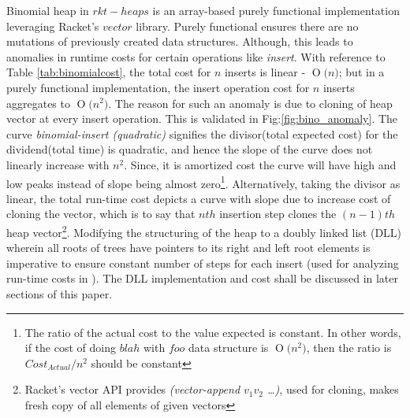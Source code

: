 \documentclass{llncs}
\newcommand{\BigO}[1]{\ensuremath{\operatorname{O}\bigl(#1\bigr)}}
\begin{document}
Binomial heap in $rkt-heaps$ is an array-based purely functional implementation leveraging Racket's $vector$ library. Purely functional ensures there are no mutations of previously created data structures. Although, this leads to anomalies in runtime costs for certain operations like \emph{insert}. With reference to Table \ref{tab:binomialcost}, the total cost for $n$ inserts is linear - \BigO{n}; but in a purely functional implementation, the insert operation cost for $n$ inserts aggregates to \BigO{n^2}. The reason for such an anomaly is due to cloning of heap vector at every insert operation. This is validated in Fig:\ref{fig:bino_anomaly}. The curve \emph{binomial-insert (quadratic)} signifies the divisor(total expected cost) for the dividend(total time) is quadratic, and hence the slope of the curve does not linearly increase with $n^2$. Since, it is amortized cost the curve will have high and low peaks instead of slope being almost zero\footnote{The ratio of the actual cost to the value expected is constant. In other words, if the cost of doing $blah$ with $foo$ data structure is \BigO{n^2}, then the ratio is $Cost_{Actual} / n^2$ should be constant}. Alternatively, taking the divisor as linear, the total run-time cost depicts a curve with slope due to increase cost of cloning the vector, which is to say that $nth$ insertion step clones the $(n-1)th$ heap vector\footnote{Racket's vector API provides \emph{(vector-append $v_1 v_2$ \dots)}, used for cloning, makes fresh copy of all elements of given vectors}. Modifying the structuring of the heap to a doubly linked list (DLL) wherein all roots of trees have pointers to its right and left root elements is imperative to ensure constant number of steps for each insert (used for analyzing run-time costs in \cite{kozen1992design}). The DLL implementation and cost shall be discussed in later sections of this paper. 
\end{document}
